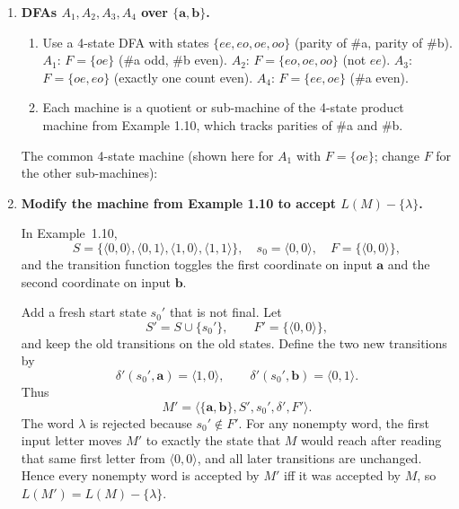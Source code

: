 \documentclass[11pt,openany]{book}
\begin{document}
\begin{enumerate}[{1.}1.]
\item \textbf{DFAs $A_1, A_2, A_3, A_4$ over $\{\mathbf{a},\mathbf{b}\}$.}

\begin{enumerate}
\item Use a 4-state DFA with states $\{ee, eo, oe, oo\}$ (parity of \#a, parity of \#b). $A_1$: $F=\{oe\}$ (\#a odd, \#b even). $A_2$: $F=\{eo,oe,oo\}$ (not $ee$). $A_3$: $F=\{oe,eo\}$ (exactly one count even). $A_4$: $F=\{ee,oe\}$ (\#a even).

\item Each machine is a quotient or sub-machine of the 4-state product machine from Example 1.10, which tracks parities of \#a and \#b.
\end{enumerate}

The common 4-state machine (shown here for $A_1$ with $F=\{oe\}$; change $F$ for the other sub-machines):

\begin{center}
\end{center}

\item \textbf{Modify the machine from Example 1.10 to accept
$L(M)-\{\lambda\}$.}

In Example~1.10,
\[
S=\{\langle0,0\rangle,\langle0,1\rangle,\langle1,0\rangle,\langle1,1\rangle\},
\quad s_0=\langle0,0\rangle,\quad F=\{\langle0,0\rangle\},
\]
and the transition function toggles the first coordinate on input $\pmb{a}$ and
the second coordinate on input $\pmb{b}$.

Add a fresh start state $s_0'$ that is not final.  Let
\[
S'=S\cup\{s_0'\},\qquad F'=\{\langle0,0\rangle\},
\]
and keep the old transitions on the old states.  Define the two new transitions
by
\[
\delta'(s_0',\pmb{a})=\langle1,0\rangle,\qquad
\delta'(s_0',\pmb{b})=\langle0,1\rangle.
\]
Thus
\[
M'=\langle\{\pmb{a},\pmb{b}\},S',s_0',\delta',F'\rangle.
\]
The word $\lambda$ is rejected because $s_0'\notin F'$.  For any nonempty word,
the first input letter moves $M'$ to exactly the state that $M$ would reach after
reading that same first letter from $\langle0,0\rangle$, and all later
transitions are unchanged.  Hence every nonempty word is accepted by $M'$ iff it
was accepted by $M$, so $L(M')=L(M)-\{\lambda\}$.


\end{enumerate}
\end{document}
